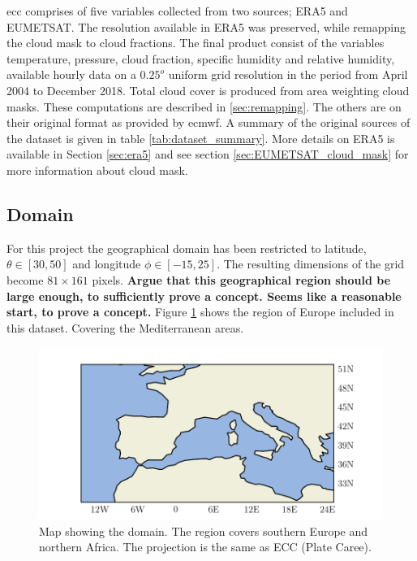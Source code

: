 \acrfull{ecc} comprises of five variables collected from two sources; ERA5 and EUMETSAT. The resolution available in ERA5 was preserved, while remapping the cloud mask to cloud fractions. The final product consist of the variables temperature, pressure, cloud fraction, specific humidity and relative humidity, available hourly data on a $0.25^o$ uniform grid resolution in the period from April 2004 to December 2018. Total cloud cover is produced from area weighting cloud masks. These computations are described in \ref{sec:remapping}. The others are on their original format as provided by \acrfull{ecmwf}. A summary of the original sources of the dataset is given in table \ref{tab:dataset_summary}. More details on ERA5 is available in Section \ref{sec:era5} and see section \ref{sec:EUMETSAT_cloud_mask} for more information about cloud mask. 


\subsection{Domain}
For this project the geographical domain has been restricted to latitude, $\theta \in[30,50]$ and longitude $\phi \in [-15, 25]$. The resulting dimensions of the grid become $81\times161$ pixels.\textbf{ Argue that this geographical region should be large enough, to sufficiently prove a concept. Seems like a reasonable start, to prove a concept.}
Figure \ref{fig:map} shows the region of Europe included in this dataset. Covering the Mediterranean areas.

\begin{figure}[h]
    \centering
    \includegraphics[scale = 1.0]{python_figs/Domain.pdf}
    \caption[Map over domain.]{Map showing the domain. The region covers southern Europe and northern Africa. The projection is the same as ECC (Plate Caree).}
    \label{fig:map}
\end{figure}

